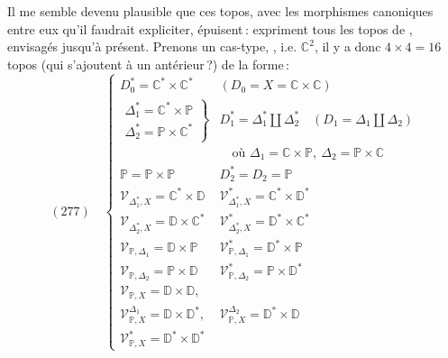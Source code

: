 \documentclass[11pt,a4paper]{article}
\begin{document}
Il me semble devenu plausible que ces topos, avec les morphismes canoniques entre eux qu'il faudrait expliciter, épuisent\,: expriment tous les topos  de , envisagés jusqu'à présent.  Prenons un cas-type,  , i.e. $\mathbb{C}^2$, \struck{\ill{}} il y a donc $4\times 4=16$ \struck{\ill{}} topos (qui s'ajoutent à un antérieur\,?) de la forme\,:
\[ (277)\quad \left\{\begin{array}{ll} D_0^*=\mathbb{C}^*\times\mathbb{C}^* & (D_0=X=\mathbb{C}\times\mathbb{C})\\[2pt] \left.\begin{array}{l}\Delta_1^*=\mathbb{C}^*\times\mathbb{P}\\ \Delta_2^*=\mathbb{P}\times\mathbb{C}^*\end{array}\right\} & D_1^*=\Delta_1^*\amalg\Delta_2^*\quad (D_1=\Delta_1\amalg\Delta_2)\\ & \quad\text{où } \Delta_1=\mathbb{C}\times\mathbb{P},\ \Delta_2=\mathbb{P}\times\mathbb{C}\\[2pt] \mathbb{P}=\mathbb{P}\times\mathbb{P} & D_2^*=D_2=\mathbb{P}\\[6pt] \mathcal{V}_{\Delta_1^*,X}=\mathbb{C}^*\times\mathbb{D} & \mathcal{V}^*_{\Delta_1^*,X}=\mathbb{C}^*\times\mathbb{D}^*\\ \mathcal{V}_{\Delta_2^*,X}=\mathbb{D}\times\mathbb{C}^* & \mathcal{V}^*_{\Delta_2^*,X}=\mathbb{D}^*\times\mathbb{C}^*\\[2pt] \mathcal{V}_{\mathbb{P},\Delta_1}=\mathbb{D}\times\mathbb{P} & \mathcal{V}^*_{\mathbb{P},\Delta_1}=\mathbb{D}^*\times\mathbb{P}\\ \mathcal{V}_{\mathbb{P},\Delta_2}=\mathbb{P}\times\mathbb{D} & \mathcal{V}^*_{\mathbb{P},\Delta_2}=\mathbb{P}\times\mathbb{D}^*\\[6pt] \mathcal{V}_{\mathbb{P},X}=\mathbb{D}\times\mathbb{D}, & \\ \mathcal{V}^{\Delta_1}_{\mathbb{P},X}=\mathbb{D}\times\mathbb{D}^*, & \mathcal{V}^{\Delta_2}_{\mathbb{P},X}=\mathbb{D}^*\times\mathbb{D}\\ \mathcal{V}^*_{\mathbb{P},X}=\mathbb{D}^*\times\mathbb{D}^* & \end{array}\right. \]
\end{document}
